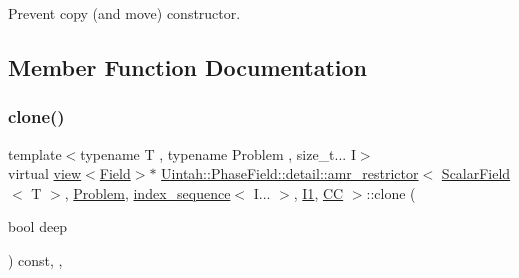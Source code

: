 Prevent copy (and move) constructor. 



\subsection{Member Function Documentation}
\mbox{\label{classUintah_1_1PhaseField_1_1detail_1_1amr__restrictor_3_01ScalarField_3_01T_01_4_00_01Problem_0778720acc9a55f696b8537356a4dbcae_ac7b27aad09d6d193f1cfe96ce2f69f8f}} 
\subsubsection{\texorpdfstring{clone()}{clone()}\hspace{0.1cm}{\footnotesize\ttfamily [1/2]}}
{\footnotesize\ttfamily template$<$typename T , typename Problem , size\+\_\+t... I$>$ \\
virtual \hyperlink{classUintah_1_1PhaseField_1_1detail_1_1view}{view}$<$\hyperlink{structUintah_1_1PhaseField_1_1ScalarField}{Field}$>$$\ast$ \hyperlink{classUintah_1_1PhaseField_1_1detail_1_1amr__restrictor}{Uintah\+::\+Phase\+Field\+::detail\+::amr\+\_\+restrictor}$<$ \hyperlink{structUintah_1_1PhaseField_1_1ScalarField}{Scalar\+Field}$<$ T $>$, \hyperlink{classUintah_1_1PhaseField_1_1Problem}{Problem}, \hyperlink{namespaceUintah_1_1PhaseField_a237de804d99512e50613aff7c94a9461}{index\+\_\+sequence}$<$ I... $>$, \hyperlink{namespaceUintah_1_1PhaseField_a547ce3002aa97fbd3ef3192a6eec8406a66f19efe774b0d2b6e5844eb2d83d305}{I1}, \hyperlink{namespaceUintah_1_1PhaseField_a33d355affda78a83f45755ba8388cedda22303704507d024d1d6508ed9859a85a}{CC} $>$\+::clone (\begin{DoxyParamCaption}\item[{bool}]{deep }\end{DoxyParamCaption}) const\hspace{0.3cm}{\ttfamily [inline]}, {\ttfamily [override]}, {\ttfamily [virtual]}}



